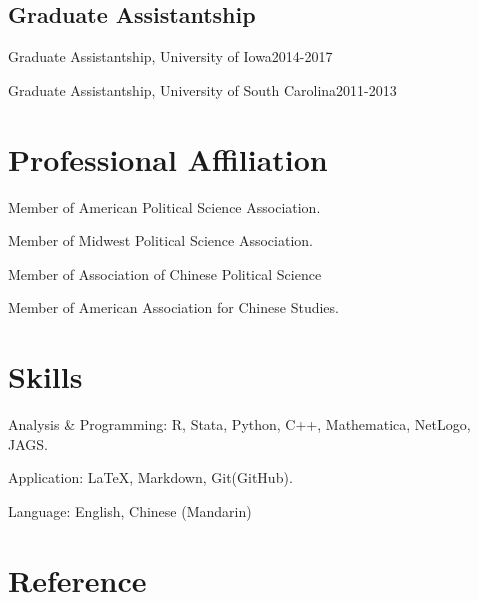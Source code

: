 \documentclass[10.5pt,]{article}
\providecommand{\tightlist}{%
  \setlength{\itemsep}{0pt}\setlength{\parskip}{0pt}}
\renewenvironment{itemize}{
  \begin{list}{}{
    \setlength{\leftmargin}{1.5em}
  }
}{
  \end{list}
}
\begin{document}
\subsection{Graduate Assistantship}\label{graduate-assistantship}

\begin{itemize}
\tightlist
\item
  Graduate Assistantship, University of Iowa\hfill 2014-2017
\item
  Graduate Assistantship, University of South Carolina\hfill 2011-2013
\end{itemize}

\section{Professional Affiliation}\label{professional-affiliation}

\begin{itemize}
\tightlist
\item
  Member of American Political Science Association.
\item
  Member of Midwest Political Science Association.
\item
  Member of Association of Chinese Political Science
\item
  Member of American Association for Chinese Studies.
\end{itemize}

\section{Skills}\label{skills}

\begin{itemize}
\tightlist
\item
  Analysis \& Programming: R, Stata, Python, C++, Mathematica, NetLogo,
  JAGS.
\item
  Application: \LaTeX, Markdown, Git(GitHub).
\item
  Language: English, Chinese (Mandarin)
\end{itemize}

\section{Reference}\label{reference}
\end{document}
